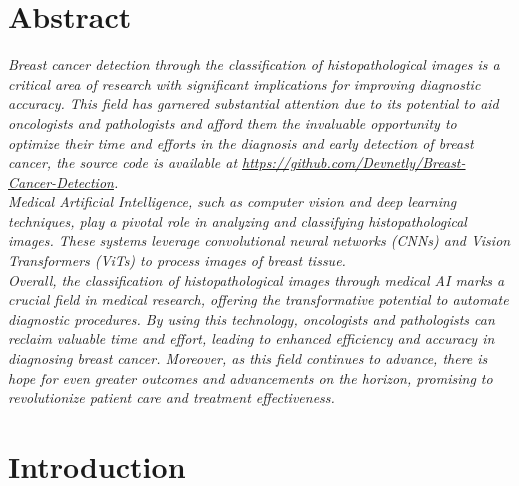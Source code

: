 \documentclass[
11pt, %
english, %
singlespacing, %
headsepline, %
]{project_structure}
\begin{document}
{
\hypersetup{linkcolor=black}
\listoftables
}

\printglossaries

\newpage
\section*{Abstract}
\textit{Breast cancer detection through the classification of histopathological images is a critical area of research with significant implications for improving diagnostic accuracy. This field has garnered substantial attention due to its potential to aid oncologists and pathologists and afford them the invaluable opportunity to optimize their time and efforts in the diagnosis and early detection of breast cancer, the source code is available at \href{https://github.com/Devnetly/Breast-Cancer-Detection}{https://github.com/Devnetly/Breast-Cancer-Detection}.}\\

\noindent \textit{Medical Artificial Intelligence, such as computer vision and deep learning techniques, play a pivotal role in analyzing and classifying histopathological images. These systems leverage convolutional neural networks (\acrshort{CNN}s) and Vision Transformers (\acrshort{ViT}s) to process images of breast tissue.}\\

\noindent \textit{Overall, the classification of histopathological images through medical AI marks a crucial field in medical research, offering the transformative potential to automate diagnostic procedures. By using this technology, oncologists and pathologists can reclaim valuable time and effort, leading to enhanced efficiency and accuracy in diagnosing breast cancer. Moreover, as this field continues to advance, there is hope for even greater outcomes and advancements on the horizon, promising to revolutionize patient care and treatment effectiveness.}

\section{Introduction}
\end{document}
